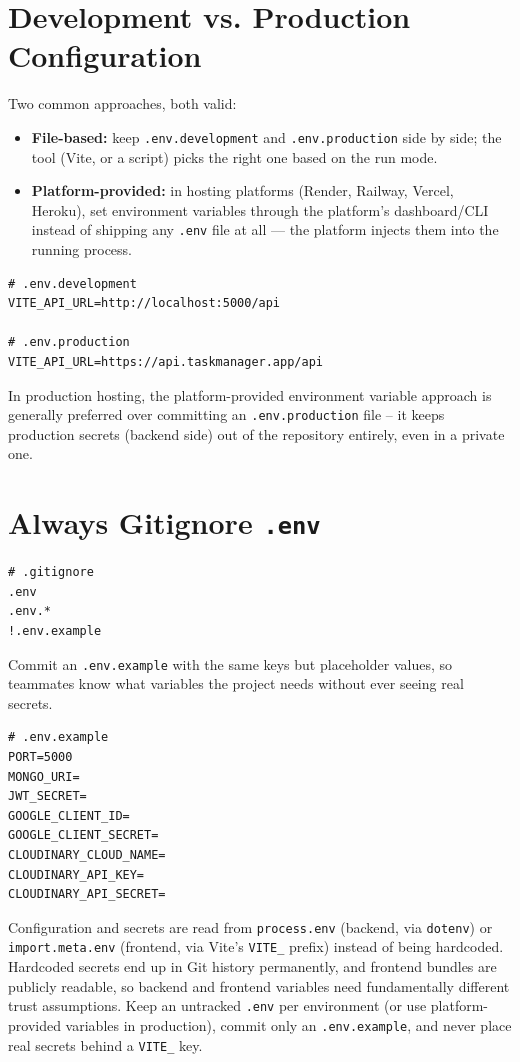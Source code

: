 \section{Development vs. Production Configuration}

Two common approaches, both valid:

\begin{itemize}
\item \textbf{File-based:} keep \texttt{.env.development} and
\texttt{.env.production} side by side; the tool (Vite, or a script) picks
the right one based on the run mode.
\item \textbf{Platform-provided:} in hosting platforms (Render, Railway,
Vercel, Heroku), set environment variables through the platform's
dashboard/CLI instead of shipping any \texttt{.env} file at all --- the
platform injects them into the running process.
\end{itemize}

\begin{lstlisting}
# .env.development
VITE_API_URL=http://localhost:5000/api

# .env.production
VITE_API_URL=https://api.taskmanager.app/api
\end{lstlisting}

\begin{notebox}[NOTE]
In production hosting, the platform-provided environment variable approach
is generally preferred over committing an \texttt{.env.production} file --
it keeps production secrets (backend side) out of the repository entirely,
even in a private one.
\end{notebox}

\section{Always Gitignore \texttt{.env}}

\begin{lstlisting}
# .gitignore
.env
.env.*
!.env.example
\end{lstlisting}

Commit an \texttt{.env.example} with the same keys but placeholder values,
so teammates know what variables the project needs without ever seeing
real secrets.

\begin{lstlisting}
# .env.example
PORT=5000
MONGO_URI=
JWT_SECRET=
GOOGLE_CLIENT_ID=
GOOGLE_CLIENT_SECRET=
CLOUDINARY_CLOUD_NAME=
CLOUDINARY_API_KEY=
CLOUDINARY_API_SECRET=
\end{lstlisting}

\whatwhyhow
{Configuration and secrets are read from \texttt{process.env} (backend, via \texttt{dotenv}) or \texttt{import.meta.env} (frontend, via Vite's \texttt{VITE\_} prefix) instead of being hardcoded.}
{Hardcoded secrets end up in Git history permanently, and frontend bundles are publicly readable, so backend and frontend variables need fundamentally different trust assumptions.}
{Keep an untracked \texttt{.env} per environment (or use platform-provided variables in production), commit only an \texttt{.env.example}, and never place real secrets behind a \texttt{VITE\_} key.}
